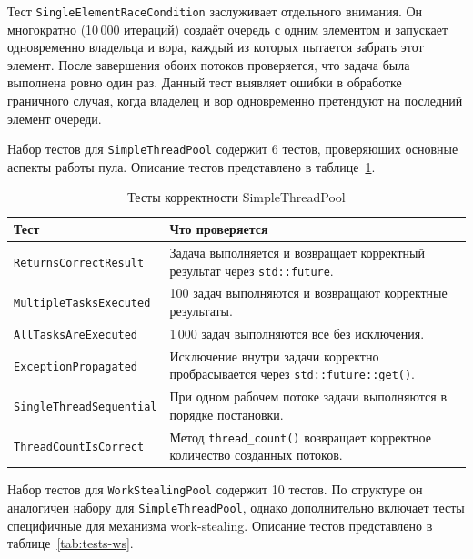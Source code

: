 Тест \texttt{SingleElementRaceCondition} заслуживает отдельного
внимания. Он многократно (10\,000 итераций) создаёт очередь
с одним элементом и запускает одновременно владельца и вора,
каждый из которых пытается забрать этот элемент. После
завершения обоих потоков проверяется, что задача была выполнена
ровно один раз. Данный тест выявляет ошибки в обработке
граничного случая, когда владелец и вор одновременно
претендуют на последний элемент очереди.

Набор тестов для \texttt{SimpleThreadPool} содержит 6 тестов,
проверяющих основные аспекты работы пула. Описание тестов
представлено в таблице~\ref{tab:tests-simple}.

\begin{table}[h]
\caption{Тесты корректности SimpleThreadPool}
\label{tab:tests-simple}
\begin{tabularx}{\textwidth}{|l|X|}
\hline
Тест & Что проверяется \\
\hline
\texttt{ReturnsCorrectResult} & Задача выполняется и возвращает корректный результат через \texttt{std::future}. \\
\hline
\texttt{MultipleTasksExecuted} & 100 задач выполняются и возвращают корректные результаты. \\
\hline
\texttt{AllTasksAreExecuted} & 1\,000 задач выполняются все без исключения. \\
\hline
\texttt{ExceptionPropagated} & Исключение внутри задачи корректно пробрасывается через \texttt{std::future::get()}. \\
\hline
\texttt{SingleThreadSequential} & При одном рабочем потоке задачи выполняются в порядке постановки. \\
\hline
\texttt{ThreadCountIsCorrect} & Метод \texttt{thread\_count()} возвращает корректное количество созданных потоков. \\
\hline
\end{tabularx}
\end{table}

Набор тестов для \texttt{WorkStealingPool} содержит 10 тестов.
По структуре он аналогичен набору для \texttt{SimpleThreadPool},
однако дополнительно включает тесты специфичные для механизма
work-stealing. Описание тестов представлено
в таблице~\ref{tab:tests-ws}.

